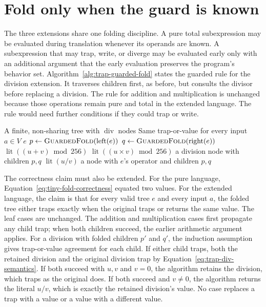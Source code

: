 \section{Fold only when the guard is known}
\label{sec:trap-guarded-folding}

The three extensions share one folding discipline.
A pure total subexpression may be evaluated during translation whenever its operands are known.
A subexpression that may trap, write, or diverge may be evaluated early only with an additional argument that the early evaluation preserves the program's behavior set.
Algorithm~\ref{alg:trap-guarded-fold} states the guarded rule for the division extension.
It traverses children first, as before, but consults the divisor before replacing a division.
The rule for addition and multiplication is unchanged because those operations remain pure and total in the extended language.
The rule would need further conditions if they could trap or write.

\begin{algorithm}
  \caption{Fold constants in the presence of a trapping division.}
  \label{alg:trap-guarded-fold}
  \begin{pseudocode}
    \Require A finite, non-sharing tree with $\operatorname{div}$ nodes
    \Ensure Same trap-or-value for every input $a\in V$
        \State \Return $e$
      \EndIf
      \State $p\gets\Call{GuardedFold}{\operatorname{left}(e)}$
      \State $q\gets\Call{GuardedFold}{\operatorname{right}(e)}$
          \State \Return $\operatorname{lit}((u+v)\bmod256)$
          \State \Return $\operatorname{lit}((u\times v)\bmod256)$
        \Else
            \State \Return a division node with children $p,q$
          \Else
            \State \Return $\operatorname{lit}(u/v)$
          \EndIf
        \EndIf
      \EndIf
      \State \Return a node with $e$'s operator and children $p,q$
    \EndFunction
  \end{pseudocode}
\end{algorithm}

The correctness claim must also be extended.
For the pure language, Equation~\ref{eq:tiny-fold-correctness} equated two values.
For the extended language, the claim is that for every valid tree $e$ and every input $a$, the folded tree either traps exactly when the original traps or returns the same value.
The leaf cases are unchanged.
The addition and multiplication cases first propagate any child trap; when both children succeed, the earlier arithmetic argument applies.
For a division with folded children $p'$ and $q'$, the induction assumption gives trap-or-value agreement for each child.
If either child traps, both the retained division and the original division trap by Equation~\ref{eq:trap-div-semantics}.
If both succeed with $u,v$ and $v=0$, the algorithm retains the division, which traps as the original does.
If both succeed and $v\neq0$, the algorithm returns the literal $u/v$, which is exactly the retained division's value.
No case replaces a trap with a value or a value with a different value.

